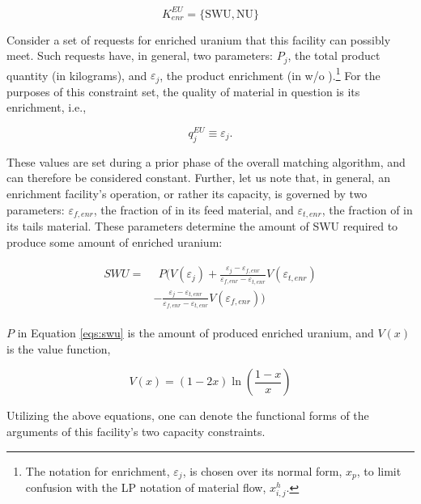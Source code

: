 \begin{equation}\label{eqs:enr-constr-commods}
  K_{enr}^{EU} = \{ \mbox{SWU}, \mbox{NU} \}
\end{equation}

Consider a set of requests for enriched uranium that this facility can possibly
meet. Such requests have, in general, two parameters: $P_{j}$, the total product
quantity (in kilograms), and $\varepsilon_{j}$, the product enrichment (in w/o
).\footnote{The notation for enrichment, $\varepsilon_{j}$, is chosen over its
normal form, $x_p$, to limit confusion with the LP notation of material flow,
$x^h_{i,j}$.}  For the purposes of this constraint set, the quality of material
in question is its enrichment, i.e.,

\begin{equation}\label{eqs:enr-q-swu}
  q_{j}^{EU} \equiv \varepsilon_{j}.
\end{equation}

These values are set during a prior phase of the overall matching algorithm, and
can therefore be considered constant. Further, let us note that, in general, an
enrichment facility's operation, or rather its capacity, is governed by two
parameters: $\varepsilon_{f,enr}$, the fraction of  in its feed material, and
$\varepsilon_{t,enr}$, the fraction of  in its tails material. These parameters
determine the amount of SWU required to produce some amount of enriched uranium:

\begin{align}
\begin{split}
\label{eqs:swu}
SWU = & \:\: P ( V(\varepsilon_{j}) 
      + \frac{\varepsilon_{j} - \varepsilon_{f,enr}}
               {\varepsilon_{f,enr} - \varepsilon_{t,enr}} V(\varepsilon_{t,enr}) \\
      & - \frac{\varepsilon_{j} - \varepsilon_{t,enr}}
               {\varepsilon_{f,enr} - \varepsilon_{t,enr}} V(\varepsilon_{f,enr}) )
\end{split}
\end{align}

$P$ in Equation \ref{eqs:swu} is the amount of produced enriched uranium, and
$V(x)$ is the value function,

\begin{equation}\label{eqs:value}
  V(x) = (1-2x) \ln \left(\frac{1-x}{x}\right)
\end{equation}

Utilizing the above equations, one can denote the functional forms of the
arguments of this facility's two capacity constraints.

